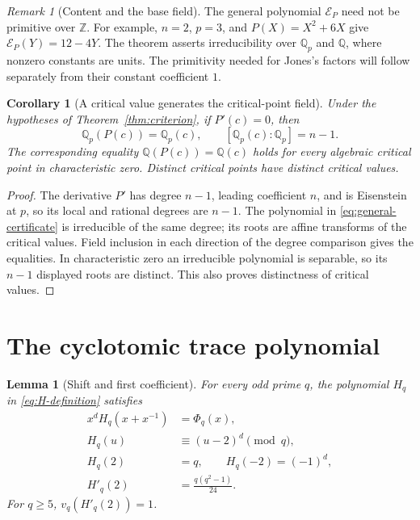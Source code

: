 \documentclass[11pt,a4paper]{article}
\newtheorem{lemma}[theorem]{Lemma}
\newtheorem{corollary}[theorem]{Corollary}
\theoremstyle{definition}
\theoremstyle{remark}
\newtheorem{remark}[theorem]{Remark}
\newcommand{\QQ}{\mathbb Q}
\newcommand{\ZZ}{\mathbb Z}
\begin{document}
\begin{remark}[Content and the base field]
The general polynomial $\mathcal E_P$ need not be primitive over
$\ZZ$. For example, $n=2$, $p=3$, and $P(X)=X^2+6X$ give
$\mathcal E_P(Y)=12-4Y$. The theorem asserts irreducibility over
$\QQ_p$ and $\QQ$, where nonzero constants are units. The
primitivity needed for Jones's factors will follow separately from
their constant coefficient $1$.
\end{remark}

\begin{corollary}[A critical value generates the critical-point field]
\label{cor:critical-field}
Under the hypotheses of Theorem~\ref{thm:criterion}, if $P'(c)=0$,
then
\[
 \QQ_p(P(c))=\QQ_p(c),\qquad [\QQ_p(c):\QQ_p]=n-1.
\]
The corresponding equality $\QQ(P(c))=\QQ(c)$ holds for every
algebraic critical point in characteristic zero. Distinct critical
points have distinct critical values.
\end{corollary}

\begin{proof}
The derivative $P'$ has degree $n-1$, leading coefficient $n$,
and is Eisenstein at $p$, so its local and rational degrees are
$n-1$. The polynomial in \eqref{eq:general-certificate} is
irreducible of the same degree; its roots are affine transforms of
the critical values. Field inclusion in each direction of the
degree comparison gives the equalities. In characteristic zero an
irreducible polynomial is separable, so its $n-1$ displayed roots
are distinct. This also proves distinctness of critical values.
\end{proof}

\section{The cyclotomic trace polynomial}\label{sec:cyclotomic}

\begin{lemma}[Shift and first coefficient]\label{lem:shift}
For every odd prime $q$, the polynomial $H_q$ in
\eqref{eq:H-definition} satisfies
\begin{align}
 x^dH_q(x+x^{-1})&=\Phi_q(x),\label{eq:cyclotomic-trace}\\
 H_q(u)&\equiv(u-2)^d\pmod q,\label{eq:shift-congruence}\\
 H_q(2)&=q,\qquad H_q(-2)=(-1)^d,\label{eq:endpoints}\\
 H'_q(2)&=\frac{q(q^2-1)}{24}.\label{eq:first-coefficient}
\end{align}
For $q\ge5$, $v_q(H'_q(2))=1$.
\end{lemma}
\end{document}
